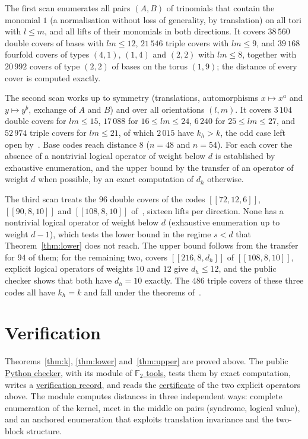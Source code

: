 \documentclass[11pt,a4paper]{article}
\theoremstyle{definition}
\theoremstyle{plain}
\newcommand{\F}{\mathbb{F}_2}
\newcommand{\code}[1]{[\![#1]\!]}
\begin{document}
The first scan enumerates all pairs $(A,B)$ of trinomials that contain the
monomial $1$ (a normalisation without loss of generality, by translation) on
all tori with $l\le m$, and all lifts of their monomials in both directions.
It covers $38\,560$ double covers of bases with $lm\le12$, $21\,546$ triple
covers with $lm\le9$, and $39\,168$ fourfold covers of types $(4,1)$, $(1,4)$
and $(2,2)$ with $lm\le8$, together with $20\,992$ covers of type $(2,2)$ of
bases on the torus $(1,9)$; the distance of every cover is computed exactly.

The second scan works up to symmetry (translations, automorphisms
$x\mapsto x^a$ and $y\mapsto y^b$, exchange of $A$ and $B$) and over all
orientations $(l,m)$. It covers $3\,104$ double covers for $lm\le15$,
$17\,088$ for $16\le lm\le24$, $6\,240$ for $25\le lm\le27$, and $52\,974$
triple covers for $lm\le21$, of which $2\,015$ have $k_h>k$, the odd case left
open by~\cite{Symons2025}. Base codes reach distance $8$ ($n=48$ and $n=54$).
For each cover the absence of a nontrivial logical operator of weight below
$d$ is established by exhaustive enumeration, and the upper bound by the
transfer of an operator of weight $d$ when possible, by an exact computation
of $d_h$ otherwise.

The third scan treats the $96$ double covers of the codes $\code{72,12,6}$,
$\code{90,8,10}$ and $\code{108,8,10}$ of~\cite{Bravyi2024}, sixteen lifts per
direction. None has a nontrivial logical operator of weight below $d$
(exhaustive enumeration up to weight $d-1$), which tests the lower bound in the
regime $s<d$ that Theorem~\ref{thm:lower} does not reach. The upper bound
follows from the transfer for $94$ of them; for the remaining two, covers
$\code{216,8,d_h}$ of $\code{108,8,10}$, explicit logical operators of weights
$10$ and $12$ give $d_h\le12$, and the public checker shows that both have
$d_h=10$ exactly. The $486$ triple covers of these three codes all have
$k_h=k$ and fall under the theorems of~\cite{Symons2025}.

\section{Verification}\label{sec:verification}
Theorems~\ref{thm:k}, \ref{thm:lower} and~\ref{thm:upper} are proved above.
The public
\href{https://github.com/jpbruneton/open_quantum_problems/blob/main/research/entries/bivariate-bicycle-coverings/checks/check_bb_covers.py}{Python checker},
with its module of
\href{https://github.com/jpbruneton/open_quantum_problems/blob/main/research/entries/bivariate-bicycle-coverings/checks/bb_tools.py}{$\F$ tools},
tests them by exact computation, writes a
\href{https://github.com/jpbruneton/open_quantum_problems/blob/main/research/entries/bivariate-bicycle-coverings/data/verification.json}{verification record},
and reads the
\href{https://github.com/jpbruneton/open_quantum_problems/blob/main/research/entries/bivariate-bicycle-coverings/data/witnesses_108_covers.json}{certificate}
of the two explicit operators above. The module computes distances in three
independent ways: complete enumeration of the kernel, meet in the middle on
pairs (syndrome, logical value), and an anchored enumeration that exploits
translation invariance and the two-block structure.
\end{document}
